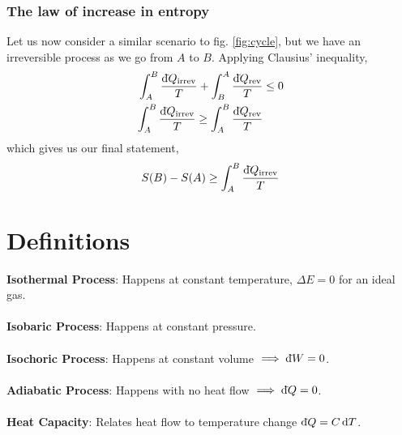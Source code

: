 \documentclass{book}
\newcommand{\dbar}{\mathrm{d}\hspace*{-0.08em}\bar{}\hspace*{0.1em}}
\begin{document}
\subsection{The law of increase in entropy}
Let us now consider a similar scenario to fig. \ref{fig:cycle}, but we have an irreversible process as we go from $A$ to $B$. Applying Clausius' inequality,
\begin{equation}
	\begin{split}
		\int_A^B \frac{\dbar Q_{\text{irrev}}}{T} + \int_B^A \frac{\dbar Q_{\text{rev}}}{T} & \leq 0\\
		\int_A^B\frac{\dbar Q_{\text{irrev}}}{T} \geq \int_A^B\frac{\dbar Q_{\text{rev}}}{T}
	\end{split}
\end{equation}
which gives us our final statement,
\begin{equation}
	S(B) - S(A) \geq \int_A^B \frac{\dbar Q_{\text{irrev}}}{T}
\end{equation}
\appendix
\chapter{Definitions}
\textbf{Isothermal Process}:  Happens at constant temperature, $\Delta E = 0$ for an ideal gas.
\\\\
\textbf{Isobaric Process}: Happens at constant pressure.
\\\\
\textbf{Isochoric Process}: Happens at constant volume $\implies \dbar W = 0$.
\\\\
\textbf{Adiabatic Process}: Happens with no heat flow $\implies \dbar Q = 0$.
\\\\
\textbf{Heat Capacity}: Relates heat flow to temperature change $\dbar Q = C \dd{T}$.
\end{document}

